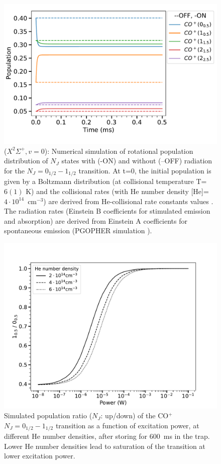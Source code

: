 \begin{figure}[!htb]
    \centering
    \includegraphics[scale=0.4]{chapters/CO+_ROSAA_paper/CO+_population.pdf}
    \caption{\co ($X ^2\Sigma ^+, v=0$): Numerical simulation of rotational population distribution of $N_J$ states with (-ON) and without (--OFF) radiation for the $N_J=0_{1/2}-1_{1/2}$ transition. At t=0, the initial population is given by a Boltzmann distribution (at collisional temperature T=$6(1)$ K) and the collisional rates (with He number density [He]=$4\cdot10^{14}$~cm$^{-3}$) are derived from He-\co collisional rate constants values \cite{CO+He_collision}. The radiation rates (Einstein B  coefficients for stimulated emission and absorption) are derived from Einstein A coefficients for  spontaneous emission (PGOPHER simulation \cite{western_pgopher_2017}). }
    \label{fig:population}
\end{figure}

    \begin{figure}
        \centering
        \includegraphics[scale=0.4]{chapters/CO+_ROSAA_paper/comapreNumberDensity.pdf}
        \caption{Simulated population ratio ($N_J$: up/down) of the CO$^+$ $N_J=0_{1/2}-1_{1/2}$ transition as a function of excitation power, at different He number densities, after storing for 600~ms in the trap. Lower He number densities lead to saturation of the transition at lower excitation power.}
        \label{fig::power-dep}
    \end{figure}

